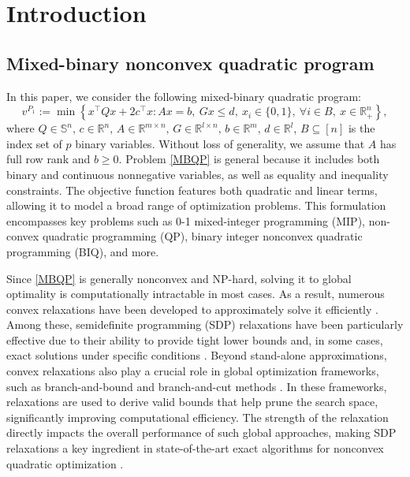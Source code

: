 \documentclass[11pt]{article}
\theoremstyle{plain}
\def\R{\mathbb{R}}
\begin{document}

\section{Introduction}\label{sec-intro}



\subsection{Mixed-binary nonconvex quadratic program}

In this paper, we consider the following mixed-binary quadratic program:
%
\begin{equation}\label{MBQP}
v^{P_1}:=\min\left\{x^{\top} Q x+2 c^{\top}x :  Ax=b,\ Gx\leq d,\ x_i \in\{0,1\},\ \forall i \in B,\ x\in \R^{n}_+\right\},\tag{MBQP}
\end{equation}
%
where $Q\in \mathbb{S}^{n},\,c\in\R^n,\, A \in \R^{m\times n},\, G \in \R^{l\times n},\, b \in \R^m,\, d \in \R^l$, $B\subseteq[n]$ is the index set of $p$ binary variables. Without loss of generality, we assume that $A$ has full row rank and $b\geq 0.$ Problem \eqref{MBQP} is general because it includes both binary and continuous nonnegative variables, as well as equality and inequality constraints. The objective function features both quadratic and linear terms, allowing it to model a broad range of optimization problems. This formulation encompasses key problems such as 0-1 mixed-integer programming (MIP), non-convex quadratic programming (QP), binary integer nonconvex quadratic programming (BIQ), and more.

%
%

Since \eqref{MBQP} is generally nonconvex and NP-hard, solving it to global optimality is computationally intractable in most cases. As a result, numerous convex relaxations have been developed to approximately solve it efficiently \cite{bomze2002solving,bundfuss2009adaptive}. 
Among these, semidefinite programming (SDP) relaxations have been particularly effective due to their ability to provide tight lower bounds and, in some cases, exact solutions under specific conditions \cite{goemans1995improved,wang2022tightness,burer2020exact,arima2024exact}.
Beyond stand-alone approximations, convex relaxations also play a crucial role in global optimization frameworks, such as branch-and-bound and branch-and-cut methods \cite{lawler1966branch,mitchell2002branch}. In these frameworks, relaxations are used to derive valid bounds that help prune the search space, significantly improving computational efficiency. The strength of the relaxation directly impacts the overall performance of such global approaches, making SDP relaxations a key ingredient in state-of-the-art exact algorithms for nonconvex quadratic optimization \cite{buchheim2013semidefinite,gusmeroli2022biqbin,krislock2017biqcrunch}.
\end{document}
